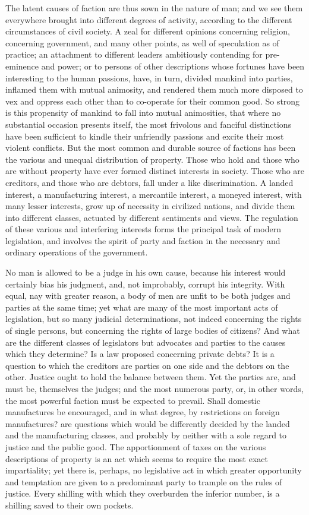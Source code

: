 The latent causes of faction are thus sown in the nature of man; and we see them everywhere brought into different degrees of activity, according to the different circumstances of civil society. A zeal for different opinions concerning religion, concerning government, and many other points, as well of speculation as of practice; an attachment to different leaders ambitiously contending for pre-eminence and power; or to persons of other descriptions whose fortunes have been interesting to the human passions, have, in turn, divided mankind into parties, inflamed them with mutual animosity, and rendered them much more disposed to vex and oppress each other than to co-operate for their common good. So strong is this propensity of mankind to fall into mutual animosities, that where no substantial occasion presents itself, the most frivolous and fanciful distinctions have been sufficient to kindle their unfriendly passions and excite their most violent conflicts. But the most common and durable source of factions has been the various and unequal distribution of property. Those who hold and those who are without property have ever formed distinct interests in society. Those who are creditors, and those who are debtors, fall under a like discrimination. A landed interest, a manufacturing interest, a mercantile interest, a moneyed interest, with many lesser interests, grow up of necessity in civilized nations, and divide them into different classes, actuated by different sentiments and views. The regulation of these various and interfering interests forms the principal task of modern legislation, and involves the spirit of party and faction in the necessary and ordinary operations of the government.

No man is allowed to be a judge in his own cause, because his interest would certainly bias his judgment, and, not improbably, corrupt his integrity. With equal, nay with greater reason, a body of men are unfit to be both judges and parties at the same time; yet what are many of the most important acts of legislation, but so many judicial determinations, not indeed concerning the rights of single persons, but concerning the rights of large bodies of citizens? And what are the different classes of legislators but advocates and parties to the causes which they determine? Is a law proposed concerning private debts? It is a question to which the creditors are parties on one side and the debtors on the other. Justice ought to hold the balance between them. Yet the parties are, and must be, themselves the judges; and the most numerous party, or, in other words, the most powerful faction must be expected to prevail. Shall domestic manufactures be encouraged, and in what degree, by restrictions on foreign manufactures? are questions which would be differently decided by the landed and the manufacturing classes, and probably by neither with a sole regard to justice and the public good. The apportionment of taxes on the various descriptions of property is an act which seems to require the most exact impartiality; yet there is, perhaps, no legislative act in which greater opportunity and temptation are given to a predominant party to trample on the rules of justice. Every shilling with which they overburden the inferior number, is a shilling saved to their own pockets.

